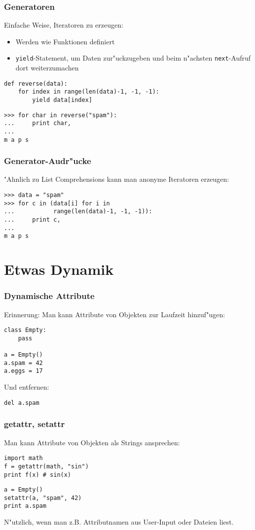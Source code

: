 \begin{frame}[fragile]
\frametitle{Generatoren}
Einfache Weise, Iteratoren zu erzeugen:
\begin{itemize}
\item Werden wie Funktionen definiert
\item \lstinline{yield}-Statement, um Daten zur"uckzugeben und beim n"achsten \lstinline{next}-Aufruf dort weiterzumachen
\end{itemize}
\begin{lstlisting}[style=Python]
def reverse(data):
    for index in range(len(data)-1, -1, -1):
        yield data[index]
\end{lstlisting}
\begin{lstlisting}[style=Shell]
>>> for char in reverse("spam"):
...     print char,
...
m a p s
\end{lstlisting}
\end{frame}

\begin{frame}[fragile]
\frametitle{Generator-Audr"ucke}
"Ahnlich zu List Comprehensions kann man anonyme Iteratoren erzeugen:
\begin{lstlisting}[style=Shell]
>>> data = "spam"
>>> for c in (data[i] for i in
...           range(len(data)-1, -1, -1)):
...     print c,
...
m a p s
\end{lstlisting}
\end{frame}


\section{Etwas Dynamik}
\begin{frame}[fragile]
\frametitle{Dynamische Attribute}
Erinnerung: Man kann Attribute von Objekten zur Laufzeit hinzuf"ugen:
\begin{lstlisting}
class Empty:
    pass

a = Empty()
a.spam = 42
a.eggs = 17
\end{lstlisting}
\vspace{2mm}
Und entfernen:
\begin{lstlisting}
del a.spam
\end{lstlisting}
\end{frame}

\begin{frame}[fragile]
\frametitle{getattr, setattr}
Man kann Attribute von Objekten als Strings ansprechen:
\begin{lstlisting}
import math
f = getattr(math, "sin")
print f(x) # sin(x)
\end{lstlisting}
\vspace{2mm}
\begin{lstlisting}
a = Empty()
setattr(a, "spam", 42)
print a.spam
\end{lstlisting}
N"utzlich, wenn man z.B. Attributnamen aus User-Input oder Dateien liest.
\end{frame}

